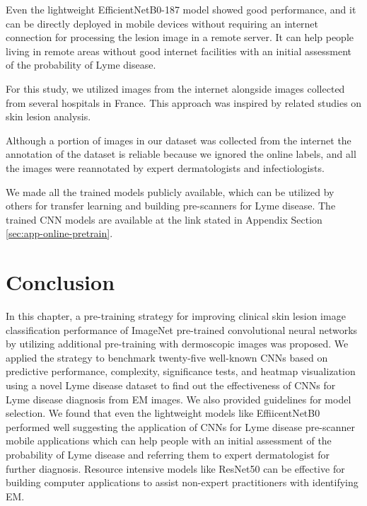 Even the lightweight EfficientNetB0-187 model showed good performance, and it can be directly deployed in mobile devices without requiring an internet connection for processing the lesion image in a remote server. It can help people living in remote areas without good internet facilities with an initial assessment of the probability of Lyme disease. 

For this study, we utilized images from the internet alongside images collected from several hospitals in France. This approach was inspired by related studies on skin lesion analysis. 

Although a portion of images in our dataset was collected from the internet the annotation of the dataset is reliable because we ignored the online labels, and all the images were reannotated by expert dermatologists and infectiologists.

We made all the trained models publicly available, which can be utilized by others for transfer learning and building pre-scanners for Lyme disease. The trained CNN models are available at the link stated in Appendix Section \ref{sec:app-online-pretrain}.

\section{Conclusion}\label{sec:concluion_pretrain}
In this chapter, a pre-training strategy for improving clinical skin lesion image classification performance of ImageNet pre-trained convolutional neural networks by utilizing additional pre-training with dermoscopic images was proposed. We applied the strategy to benchmark twenty-five well-known CNNs based on predictive performance, complexity, significance tests, and heatmap visualization using a novel Lyme disease dataset to find out the effectiveness of CNNs for Lyme disease diagnosis from EM images. We also provided guidelines for model selection. We found that even the lightweight models like EffiicentNetB0 performed well suggesting the application of CNNs for Lyme disease pre-scanner mobile applications which can help people with an initial assessment of the probability of Lyme disease and referring them to expert dermatologist for further diagnosis. Resource intensive models like ResNet50 can be effective for building computer applications to assist non-expert practitioners with identifying EM.


